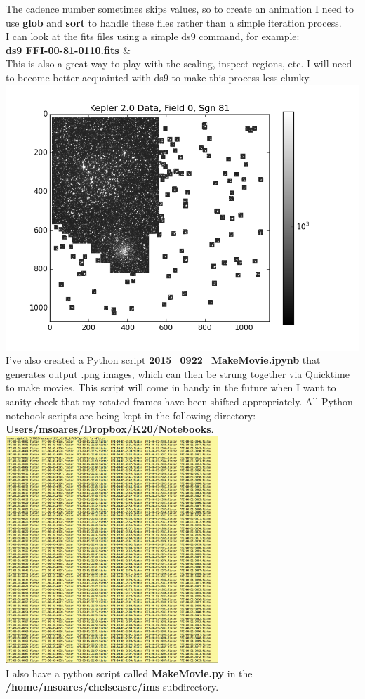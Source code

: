 \documentclass[11pt,letterpaper]{book} %
\begin{document}
The cadence number sometimes skips values, so to create an animation I need to use \textbf{glob} and \textbf{sort} to handle these files rather than a simple iteration process.\\ 
I can look at the fits files using a simple ds9 command, for example:\\ 
\textbf{ds9 FFI-00-81-0110.fits $\&$}\\ This is also a great way to play with the scaling, inspect regions, etc. I will need to become better acquainted with ds9 to make this process less clunky. \\
\includegraphics[width=\textwidth]{imagefile.png}\\
I've also created a Python script \textbf{2015\_0922\_MakeMovie.ipynb} that generates output .png images, which can then be strung together via Quicktime to make movies. This script will come in handy in the future when I want to sanity check that my rotated frames have been shifted appropriately. All Python notebook scripts are being kept in the following directory: \textbf{\/Users/msoares/Dropbox/K20/Notebooks}.
\includegraphics[width=0.6\textwidth]{files2.png}\\
I also have a python script called \textbf{MakeMovie.py} in the \textbf{/home/msoares/chelseasrc/ims} subdirectory.
\end{document}
